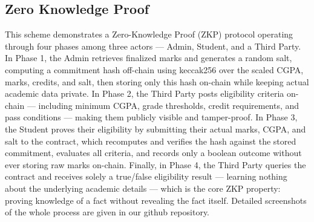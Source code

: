 \documentclass[conference]{IEEEtran}
\begin{document}
\subsection{Zero Knowledge Proof}
This scheme demonstrates a Zero-Knowledge Proof (ZKP) protocol operating through four phases among three actors — Admin, Student, and a Third Party. In Phase 1, the Admin retrieves finalized marks and generates a random salt, computing a commitment hash off-chain using keccak256 over the scaled CGPA, marks, credits, and salt, then storing only this hash on-chain while keeping actual academic data private. In Phase 2, the Third Party posts eligibility criteria on-chain — including minimum CGPA, grade thresholds, credit requirements, and pass conditions — making them publicly visible and tamper-proof. In Phase 3, the Student proves their eligibility by submitting their actual marks, CGPA, and salt to the contract, which recomputes and verifies the hash against the stored commitment, evaluates all criteria, and records only a boolean outcome without ever storing raw marks on-chain. Finally, in Phase 4, the Third Party queries the contract and receives solely a true/false eligibility result — learning nothing about the underlying academic details — which is the core ZKP property: proving knowledge of a fact without revealing the fact itself. Detailed screenshots of the whole process are given in our github repository.
\end{document}

